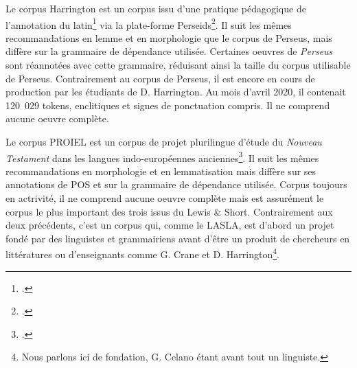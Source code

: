 Le corpus Harrington est un corpus issu d'une pratique pédagogique de l'annotation du latin\footcite{noauthor_harrington_nodate} via la plate-forme Perseids\footcite{almas_perseids_2016}. Il suit les mêmes recommandations en lemme et en morphologie que le corpus de Perseus, mais diffère sur la grammaire de dépendance utilisée. Certaines oeuvres de \textit{Perseus} sont réannotées avec cette grammaire, réduisant ainsi la taille du corpus utilisable de Perseus. Contrairement au corpus de Perseus, il est encore en cours de production par les étudiants de D. Harrington. Au mois d'avril 2020, il contenait 120~029 tokens, enclitiques et signes de ponctuation compris. Il ne comprend aucune oeuvre complète. 

Le corpus PROIEL est un corpus de projet plurilingue d'étude du \textit{Nouveau Testament} dans les langues indo-européennes anciennes\footcite{haug_creating_2008}. Il suit les mêmes recommandations en morphologie et en lemmatisation mais diffère sur ses annotations de POS et sur la grammaire de dépendance utilisée. Corpus toujours en actrivité, il ne comprend aucune oeuvre complète mais est assurément le corpus le plus important des trois issus du Lewis \& Short. Contrairement aux deux précédents, c'est un corpus qui, comme le LASLA, est d'abord un projet fondé par des linguistes et grammairiens avant d'être un produit de chercheurs en littératures ou d'enseignants comme G. Crane et D. Harrington\footnote{Nous parlons ici de fondation, G. Celano étant avant tout un linguiste.}.

\begin{table}[h]
\centering
{}
\caption{Résumé des informations sur les quatre corpus disponibles. Il existe 137 oeuvres au sens du LASLA, mais certaines sont des des découpes inhabituelles, nous préférons donc la notation 100+ ici.}
\label{tab:lemmatisation:corpus-entrainement}
\end{table}

